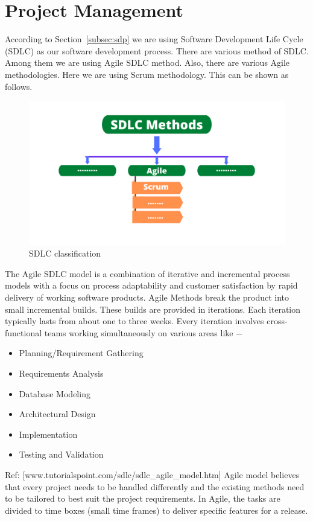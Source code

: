 \section{Project Management}\label{sec:projectmanagement}
According to Section~\ref{subsec:sdp} we are using Software Development Life Cycle (SDLC) as our software development process. There are various method of SDLC. Among them we are using Agile SDLC method. Also, there are various Agile methodologies. Here we are using Scrum methodology. This can be shown as follows.

\begin{figure}[H]
    \centering
    \includegraphics[width=1\textwidth]{images/SDLCMethods}
    \caption{SDLC classification}
    \label{fig:sdlc-class}
\end{figure}

The Agile SDLC model is a combination of iterative and incremental process models with a focus on process adaptability and customer satisfaction by rapid delivery of working software products. Agile Methods break the product into small incremental builds. These builds are provided in iterations. Each iteration typically lasts from about one to three weeks.
Every iteration involves cross-functional teams working simultaneously on various areas like −
\begin{itemize}
\item Planning/Requirement Gathering
\item Requirements Analysis
\item Database Modeling
\item Architectural Design
\item Implementation
\item Testing and Validation
\end{itemize}

Ref: [www.tutorialspoint.com/sdlc/sdlc\_agile\_model.htm]
Agile model believes that every project needs to be handled differently and the existing methods need to be tailored to best suit the project requirements. In Agile, the tasks are divided to time boxes (small time frames) to deliver specific features for a release.\\

